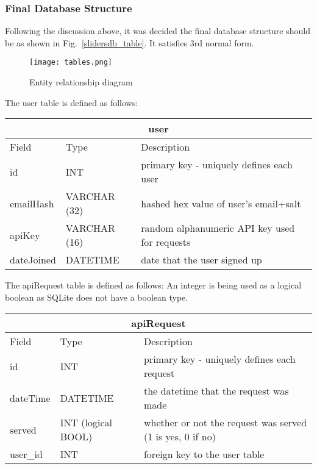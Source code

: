             \subsubsection{Final Database Structure}
            Following the discussion above, it was decided the final database structure should be as shown in Fig.~\ref{slidersdb_table}. It satisfies 3rd normal form.

            \begin{figure}[h]
                \centering
                \texttt{[image: tables.png]}
                \caption{Entity relationship diagram}
                \label{fig:db_table}
            \end{figure}
            
            The user table is defined as follows:

            \begin{tabular}{|p{2cm}|p{2cm}|p{7cm}|}
                \hline
                \multicolumn{3}{|c|}{user} \\
                \hline
                Field & Type & Description \\
                \hline
                id & INT & primary key - uniquely defines each user \\
                emailHash & VARCHAR (32) & hashed hex value of user's email+salt \\
                apiKey & VARCHAR (16) & random alphanumeric API key used for requests \\
                dateJoined & DATETIME & date that the user signed up \\
                \hline 
            \end{tabular} 

            The apiRequest table is defined as follows: An integer is being used as a logical boolean as SQLite does not have a boolean type.
            
            \begin{tabular}{|p{2cm}|p{2cm}|p{7cm}|}
                \hline
                \multicolumn{3}{|c|}{apiRequest} \\
                \hline
                Field & Type & Description \\
                \hline
                id & INT & primary key - uniquely defines each request \\
                dateTime & DATETIME & the datetime that the request was made \\
                served & INT (logical BOOL) & whether or not the request was served (1 is yes, 0 if no) \\
                user\_id & INT & foreign key to the user table \\
                \hline
            \end{tabular}
            
